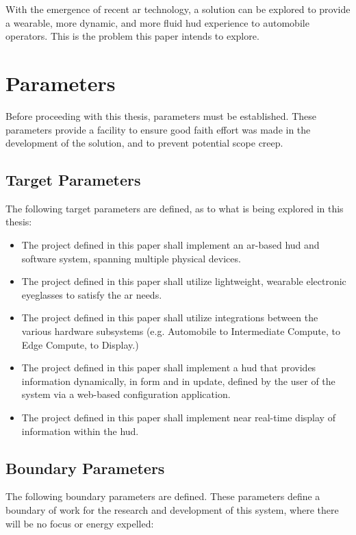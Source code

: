     \par With the emergence of recent \gls{ar} technology, a solution can be explored to provide a wearable, more dynamic, and more fluid \gls{hud} experience to automobile operators. This is the problem this paper intends to explore.

\section{Parameters}
    \par Before proceeding with this thesis, parameters must be established. These parameters provide a facility to ensure good faith effort was made in the development of the solution, and to prevent potential scope creep.

    \subsection{Target Parameters}
        \par The following target parameters are defined, as to what is being explored in this thesis:

        \begin{itemize}
            \item The project defined in this paper shall implement an \gls{ar}-based \gls{hud} and software system, spanning multiple physical devices.
            \item The project defined in this paper shall utilize lightweight, wearable electronic eyeglasses to satisfy the \gls{ar} needs.
            \item The project defined in this paper shall utilize integrations between the various hardware subsystems (e.g. Automobile to Intermediate Compute, to Edge Compute, to Display.)
            \item The project defined in this paper shall implement a \gls{hud} that provides information dynamically, in form and in update, defined by the user of the system via a web-based configuration application.
            \item The project defined in this paper shall implement near real-time display of information within the \gls{hud}.
        \end{itemize}

    \subsection{Boundary Parameters}
        \par The following boundary parameters are defined. These parameters define a boundary of work for the research and development of this system, where there will be no focus or energy expelled:

